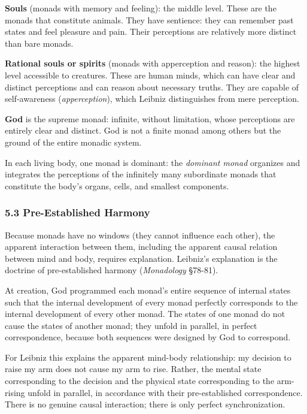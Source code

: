 \documentclass[
  11pt,
  letterpaper,
]{article}
\begin{document}
\textbf{Souls} (monads with memory and feeling): the middle level. These
are the monads that constitute animals. They have sentience: they can
remember past states and feel pleasure and pain. Their perceptions are
relatively more distinct than bare monads.

\textbf{Rational souls or spirits} (monads with apperception and
reason): the highest level accessible to creatures. These are human
minds, which can have clear and distinct perceptions and can reason
about necessary truths. They are capable of self-awareness
(\emph{apperception}), which Leibniz distinguishes from mere perception.

\textbf{God} is the supreme monad: infinite, without limitation, whose
perceptions are entirely clear and distinct. God is not a finite monad
among others but the ground of the entire monadic system.

In each living body, one monad is dominant: the \emph{dominant monad}
organizes and integrates the perceptions of the infinitely many
subordinate monads that constitute the body's organs, cells, and
smallest components.

\subsubsection{5.3 Pre-Established
Harmony}\label{pre-established-harmony}

Because monads have no windows (they cannot influence each other), the
apparent interaction between them, including the apparent causal
relation between mind and body, requires explanation. Leibniz's
explanation is the doctrine of pre-established harmony
(\emph{Monadology} §78-81).

At creation, God programmed each monad's entire sequence of internal
states such that the internal development of every monad perfectly
corresponds to the internal development of every other monad. The states
of one monad do not cause the states of another monad; they unfold in
parallel, in perfect correspondence, because both sequences were
designed by God to correspond.

For Leibniz this explains the apparent mind-body relationship: my
decision to raise my arm does not cause my arm to rise. Rather, the
mental state corresponding to the decision and the physical state
corresponding to the arm-rising unfold in parallel, in accordance with
their pre-established correspondence. There is no genuine causal
interaction; there is only perfect synchronization.
\end{document}
